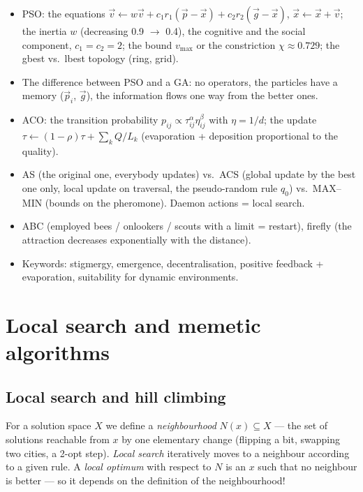 \documentclass[11pt,a4paper]{article}
\theoremstyle{definition}
\begin{document}
\begin{itemize}
\item PSO: the equations
  $\vec v \gets w\vec v + c_1r_1(\vec p - \vec x) + c_2r_2(\vec g - \vec x)$,
  $\vec x \gets \vec x + \vec v$; the inertia $w$ (decreasing 0.9 $\to$ 0.4),
  the cognitive and the social component, $c_1=c_2=2$; the bound $v_{\max}$ or
  the constriction $\chi \approx 0.729$; the gbest vs.\ lbest topology (ring,
  grid).
\item The difference between PSO and a GA: no operators, the particles have a
  memory ($\vec p_i$, $\vec g$), the information flows one way from the better
  ones.
\item ACO: the transition probability
  $p_{ij} \propto \tau_{ij}^{\alpha}\eta_{ij}^{\beta}$ with $\eta = 1/d$;
  the update $\tau \gets (1-\rho)\tau + \sum_k Q/L_k$ (evaporation + deposition
  proportional to the quality).
\item AS (the original one, everybody updates) vs.\ ACS (global update by the
  best one only, local update on traversal, the pseudo-random rule $q_0$)
  vs.\ MAX--MIN (bounds on the pheromone). Daemon actions = local search.
\item ABC (employed bees / onlookers / scouts with a limit = restart),
  firefly (the attraction decreases exponentially with the distance).
\item Keywords: stigmergy, emergence, decentralisation, positive feedback
  + evaporation, suitability for dynamic environments.
\end{itemize}


\section{Local search and memetic algorithms}
\label{sec:lokalni}

\subsection{Local search and hill climbing}

\begin{defbox}
For a solution space $X$ we define a \emph{neighbourhood}
$N(x) \subseteq X$ --- the set of solutions reachable from $x$ by one elementary
change (flipping a bit, swapping two cities, a 2-opt step). \emph{Local search}
iteratively moves to a neighbour according to a given rule. A \emph{local
optimum} with respect to $N$ is an $x$ such that no neighbour is better --- so
it depends on the definition of the neighbourhood!
\end{defbox}
\end{document}
